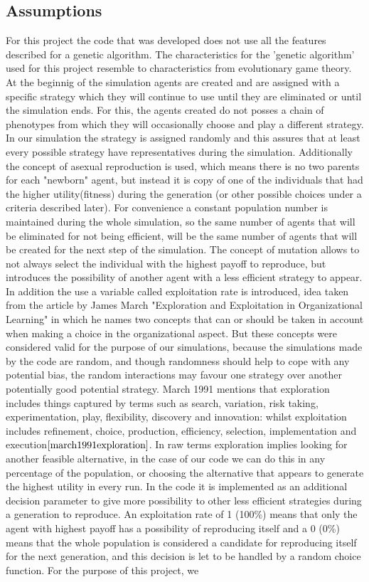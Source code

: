 \subsection{Assumptions}
For this project the code that was developed does not use all the features described for a genetic algorithm. The characteristics for the 'genetic algorithm' used for this project resemble to characteristics from evolutionary game theory. At the beginnig of the simulation agents are created and are assigned with a specific strategy which they will continue to use until they are eliminated or until the simulation ends. For this, the agents created do not posses a chain of phenotypes from which they will occasionally choose and play a different strategy. In our simulation the strategy is assigned randomly and this assures that at least every possible strategy have representatives during the simulation. Additionally the concept of asexual reproduction is used, which means there is no two parents for each "newborn" agent, but instead it is copy of one of the individuals that had the higher utility(fitness) during the generation (or other possible choices under a criteria described later). For convenience a constant population number is maintained during the whole simulation, so the same number of agents that will be eliminated for not being efficient, will be the same number of agents that will be created for the next step of the simulation. The concept of mutation allows to not always select the individual with the highest payoff to reproduce, but introduces the possibility of another agent with a less efficient strategy to appear. In addition the use a variable called exploitation rate is introduced, idea taken from the article by James March "Exploration and Exploitation in Organizational Learning" in which he names two concepts that can or should be taken in account when making a choice in the organizational aspect. But these concepts were considered valid for the purpose of our simulations, because the simulations made by the code are random, and though randomness should help to cope with any potential bias, the random interactions may favour one strategy over another potentially good potential strategy. March 1991 mentions that exploration includes things captured by terms such as search, variation, risk taking, experimentation, play, flexibility, discovery and innovation: whilst exploitation includes refinement, choice, production, efficiency, selection, implementation and execution$\cite{march1991exploration}$. In raw terms exploration implies looking for another feasible alternative, in the case of our code we can do this in any percentage of the population, or choosing the alternative that appears to generate the highest utility in every run. In the code it is implemented as  an additional decision parameter to give more possibility to other less efficient strategies during a generation to reproduce. An exploitation rate of 1 (100\%) means that only the agent with highest payoff has a possibility of reproducing itself and a 0 (0\%) means that the whole population is considered a candidate for reproducing itself for the next generation, and this decision is let to be handled by a random choice function. For the purpose of this project, we 